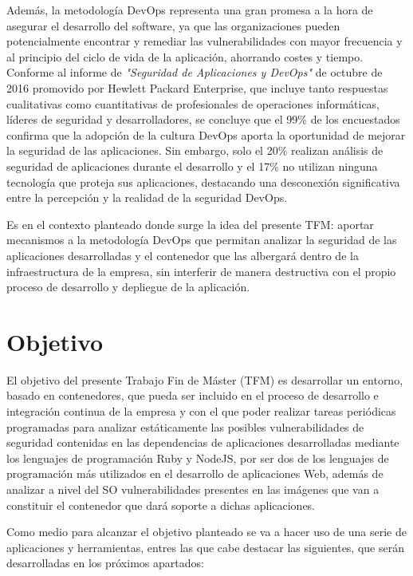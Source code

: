 Además, la metodología	 \gls{DevOps} representa una gran promesa a la hora de asegurar el desarrollo del software, ya que las organizaciones pueden potencialmente encontrar y remediar las vulnerabilidades con mayor frecuencia y al principio del ciclo de vida de la aplicación, ahorrando costes y tiempo. Conforme al informe de  \textit{"Seguridad de Aplicaciones y DevOps"} de octubre de 2016 promovido por Hewlett Packard Enterprise\cite{hpe2016}, que incluye tanto respuestas cualitativas como cuantitativas de profesionales de operaciones informáticas, líderes de seguridad y desarrolladores, se concluye que el 99\% de los encuestados confirma que la adopción de la cultura \gls{DevOps} aporta la oportunidad de mejorar la seguridad de las aplicaciones. Sin embargo, solo el 20\% realizan análisis de seguridad de aplicaciones durante el desarrollo y el 17\% no utilizan ninguna tecnología que proteja sus aplicaciones, destacando una desconexión significativa entre la percepción y la realidad de la seguridad \gls{DevOps}.

Es en el contexto planteado donde surge la idea del presente \gls{TFM}: aportar mecanismos a la metodología \gls{DevOps} que permitan analizar la seguridad de las aplicaciones desarrolladas y el contenedor que las albergará dentro de la infraestructura de la empresa, sin interferir de manera destructiva con el propio proceso de desarrollo y depliegue de la aplicación.

\section{Objetivo}

El objetivo del presente Trabajo Fin de Máster (\gls{TFM}) es desarrollar un entorno, basado en contenedores, que pueda ser incluido en el proceso de desarrollo e integración continua de la empresa y con el que poder realizar tareas periódicas programadas para analizar estáticamente las posibles vulnerabilidades de seguridad contenidas en las dependencias de aplicaciones desarrolladas mediante los lenguajes de programación Ruby y NodeJS, por ser dos de los lenguajes de programación más utilizados en el desarrollo de aplicaciones Web, además de analizar a nivel del \gls{SO} vulnerabilidades presentes en las imágenes que van a constituir el contenedor que dará soporte a dichas aplicaciones.

Como medio para alcanzar el objetivo planteado se va a hacer uso de una serie de aplicaciones y herramientas, entres las que cabe destacar las siguientes, que serán desarrolladas en los próximos apartados:

